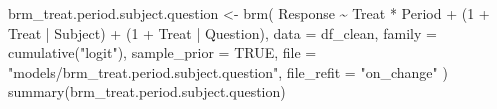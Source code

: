 \documentclass[
  12pt,
  a4paper,
  extrafontsizes,
  onecolumn,
  openright]{memoir}
\newenvironment{Shaded}{\begin{snugshade}}{\end{snugshade}}
\newcommand{\AttributeTok}[1]{\textcolor[rgb]{0.40,0.45,0.13}{#1}}
\newcommand{\ConstantTok}[1]{\textcolor[rgb]{0.56,0.35,0.01}{#1}}
\newcommand{\DecValTok}[1]{\textcolor[rgb]{0.68,0.00,0.00}{#1}}
\newcommand{\FunctionTok}[1]{\textcolor[rgb]{0.28,0.35,0.67}{#1}}
\newcommand{\NormalTok}[1]{\textcolor[rgb]{0.00,0.23,0.31}{#1}}
\newcommand{\OtherTok}[1]{\textcolor[rgb]{0.00,0.23,0.31}{#1}}
\newcommand{\SpecialCharTok}[1]{\textcolor[rgb]{0.37,0.37,0.37}{#1}}
\newcommand{\StringTok}[1]{\textcolor[rgb]{0.13,0.47,0.30}{#1}}
\begin{document}
\begin{Shaded}
\begin{Highlighting}[]
\NormalTok{brm\_treat.period.subject.question }\OtherTok{\textless{}{-}} \FunctionTok{brm}\NormalTok{(}
\NormalTok{    Response }\SpecialCharTok{\textasciitilde{}}\NormalTok{ Treat }\SpecialCharTok{*}\NormalTok{ Period }\SpecialCharTok{+}\NormalTok{ (}\DecValTok{1} \SpecialCharTok{+}\NormalTok{ Treat }\SpecialCharTok{|}\NormalTok{ Subject) }\SpecialCharTok{+}\NormalTok{ (}\DecValTok{1} \SpecialCharTok{+}\NormalTok{ Treat }\SpecialCharTok{|}\NormalTok{ Question),}
    \AttributeTok{data =}\NormalTok{ df\_clean,}
    \AttributeTok{family =} \FunctionTok{cumulative}\NormalTok{(}\StringTok{"logit"}\NormalTok{),}
    \AttributeTok{sample\_prior =} \ConstantTok{TRUE}\NormalTok{,}
    \AttributeTok{file =} \StringTok{"models/brm\_treat.period.subject.question"}\NormalTok{,}
    \AttributeTok{file\_refit =} \StringTok{"on\_change"}
\NormalTok{)}
\FunctionTok{summary}\NormalTok{(brm\_treat.period.subject.question)}
\end{Highlighting}
\end{Shaded}
\end{document}
